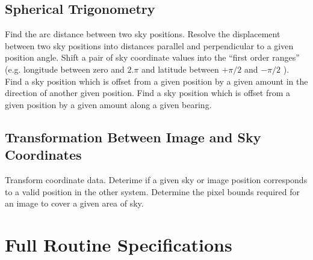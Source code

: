 \subsection {Spherical Trigonometry}
   {Find the arc distance between two sky positions.}
   {Resolve the displacement between two sky positions into distances parallel 
    and perpendicular to a given position angle.}
   {Shift a pair of sky coordinate values into the ``first order ranges'' (e.g. 
   longitude between zero and $2.\pi$ and latitude between $+\pi/2$ and 
   $-\pi/2$ ).}
   {Find a sky position which is offset from a given position by a given
   amount in the direction of another given position.}
   {Find a sky position which is offset from a given position by a given
   amount along a given  bearing.}

\subsection {Transformation Between Image and Sky Coordinates}
   {Transform coordinate data.} 
   {Deterime if a given sky or image position corresponds to a valid position
    in the other system.}
   {Determine the pixel bounds required for an image to cover a given area of 
    sky.}

\section {Full Routine Specifications}
\label {SEC:FULLSPEC}

\renewcommand{\_}{{\tt\char'137}}






